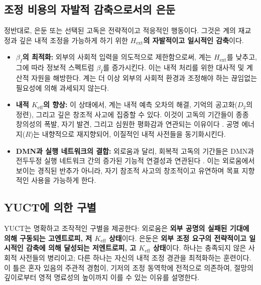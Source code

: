 \documentclass[12pt,a4paper]{article}
\begin{document}
	\subsection{조정 비용의 자발적 감축으로서의 은둔}
	
	정반대로, 은둔 또는 선택된 고독은 전략적이고 적응적인 행동이다. 그것은 계의 재교정과 깊은 내적 조정을 가능하게 하기 위한 \textbf{\(H_{\mathrm{ext}}\)의 자발적이고 일시적인 감축}이다.
	
	\begin{itemize}
		\item \textbf{\(\beta_I\)의 최적화:} 외부의 사회적 입력을 의도적으로 제한함으로써, 계는 \(H_{\mathrm{ext}}\)를 낮추고, 그에 따라 정보적 스펙트럼 \(\beta_I\)를 증가시킨다. 이는 내적 처리를 위한 대사적 및 계산적 자원을 해방한다. 계는 더 이상 외부의 사회적 환경과 조정해야 하는 끊임없는 필요성에 의해 과세되지 않는다.
		\item \textbf{내적 \(K_{\mathrm{eff}}\)의 향상:} 이 상태에서, 계는 내적 예측 오차의 해결, 기억의 공고화(\(D_2\)의 정련), 그리고 깊은 창조적 사고에 집중할 수 있다. 이것이 고독의 기간들이 종종 창의성의 폭발, 자기 발견, 그리고 심원한 평화감과 연관되는 이유이다 \cite{Nguyen2023}. 공명 에너지(\(R\))는 내향적으로 재지향되어, 이질적인 내적 사전들을 동기화시킨다.
		\item \textbf{DMN과 실행 네트워크의 결합:} 외로움과 달리, 회복적 고독의 기간들은 DMN과 전두두정 실행 네트워크 간의 증가된 기능적 연결성과 연관된다 \cite{Llera2024}. 이는 외로움에서 보이는 경직된 반추가 아니라, 자기 참조적 사고의 창조적이고 유연하며 목표 지향적인 사용을 가능하게 한다.
	\end{itemize}
	
	\subsection{YUCT에 의한 구별}
	
	YUCT는 명확하고 조작적인 구별을 제공한다: 외로움은 \textbf{외부 공명의 실패된 기대에 의해 구동되는 고엔트로피, 저 \(K_{\mathrm{eff}}\) 상태}이다. 은둔은 \textbf{외부 조정 요구의 전략적이고 일시적인 감축에 의해 달성되는 저엔트로피, 고 \(K_{\mathrm{eff}}\) 상태}이다. 하나는 충족되지 않은 사회적 사전들의 병리이고; 다른 하나는 자신의 내적 조정 경관을 최적화하는 훈련이다. 이 틀은 혼자 있음의 주관적 경험이, 기저의 조정 동역학에 전적으로 의존하여, 절망의 깊이로부터 영적 명료성의 높이까지 이를 수 있는 이유를 설명한다.
	
\end{document}
